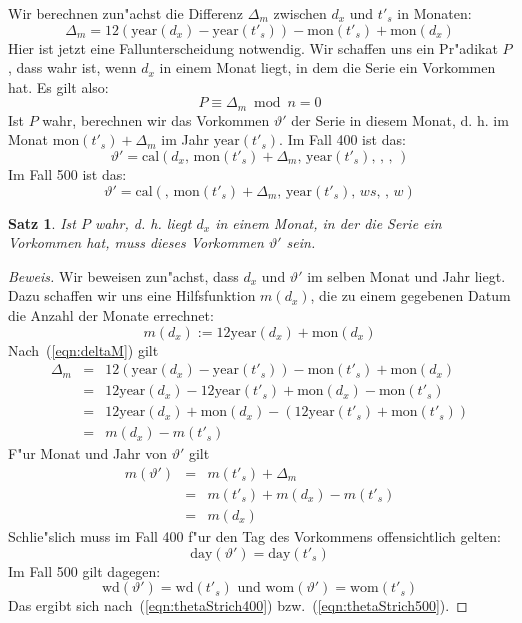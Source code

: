 \documentclass[a4paper]{article}
\newcommand*{\dayf}{\mathrm{day}}
\newcommand*{\monf}{\mathrm{mon}}
\newcommand*{\yearf}{\mathrm{year}}
\newcommand*{\wdf}{\mathrm{wd}}
\newcommand*{\womf}{\mathrm{wom}}
\newcommand*{\calf}{\mathrm{cal}}
\numberwithin{equation}{section}
\newtheorem{thm}{Satz}
\begin{document}
Wir berechnen zun"achst die Differenz $\Delta_m$ zwischen $d_x$ und $t'_s$ in
Monaten:
\begin{equation}\label{eqn:deltaM}
  \Delta_m = 12 (\yearf(d_x)-\yearf(t'_s)) - \monf(t'_s) + \monf(d_x)
\end{equation}
Hier ist jetzt eine Fallunterscheidung notwendig. Wir schaffen uns ein Pr"adikat
$P$, dass wahr ist, wenn $d_x$ in einem Monat liegt, in dem die Serie ein
Vorkommen hat. Es gilt also:
\begin{equation}P \equiv \Delta_m \bmod n = 0\end{equation}
Ist $P$ wahr, berechnen wir das Vorkommen $\vartheta'$ der Serie in diesem
Monat, d. h. im Monat $\monf(t'_s) + \Delta_m$ im Jahr $\yearf(t'_s)$. Im Fall
400 ist das:
\begin{equation}\label{eqn:thetaStrich400}
  \vartheta' = \calf(d_x,\,\monf(t'_s) + \Delta_m,\,\yearf(t'_s),\,,\,,\,)
\end{equation}
Im Fall 500 ist das:
\begin{equation}\label{eqn:thetaStrich500}
  \vartheta' = \calf(,\,\monf(t'_s) + \Delta_m,\,\yearf(t'_s),\,ws,\,,\,w)
\end{equation}
\begin{thm}
Ist $P$ wahr, d. h. liegt $d_x$ in einem Monat, in der die Serie ein Vorkommen
hat, muss dieses Vorkommen $\vartheta'$ sein.
\end{thm}
\begin{proof}[Beweis]
Wir beweisen zun"achst, dass $d_x$ und $\vartheta'$ im selben Monat und Jahr
liegt. Dazu schaffen wir uns eine Hilfsfunktion $m(d_x)$, die zu einem gegebenen
Datum die Anzahl der Monate errechnet:
\begin{equation}m(d_x) := 12\yearf(d_x) + \monf(d_x)\end{equation}
Nach~(\ref{eqn:deltaM}) gilt
\begin{eqnarray}
  \Delta_m & = & 12 (\yearf(d_x)-\yearf(t'_s)) - \monf(t'_s) + \monf(d_x) \\
    & = & 12\yearf(d_x) - 12\yearf(t'_s) + \monf(d_x) - \monf(t'_s) \\
    & = & 12\yearf(d_x) + \monf(d_x) - (12\yearf(t'_s) + \monf(t'_s)) \\
    & = & m(d_x) - m(t'_s)
\end{eqnarray}
F"ur Monat und Jahr von $\vartheta'$ gilt
\begin{eqnarray}
  m(\vartheta') & = & m(t'_s) + \Delta_m \\
    & = & m(t'_s) + m(d_x) - m(t'_s) \\
    & = & m(d_x)
\end{eqnarray}
Schlie"slich muss im Fall 400 f"ur den Tag des Vorkommens offensichtlich gelten:
\begin{equation}\dayf(\vartheta') = \dayf(t'_s)\end{equation}
Im Fall 500 gilt dagegen:
\begin{equation}
  \wdf(\vartheta') = \wdf(t'_s) \textrm{ und } \womf(\vartheta') = \womf(t'_s)
\end{equation}
Das ergibt sich nach~(\ref{eqn:thetaStrich400}) bzw.~(\ref{eqn:thetaStrich500}).
\end{proof}
\end{document}
